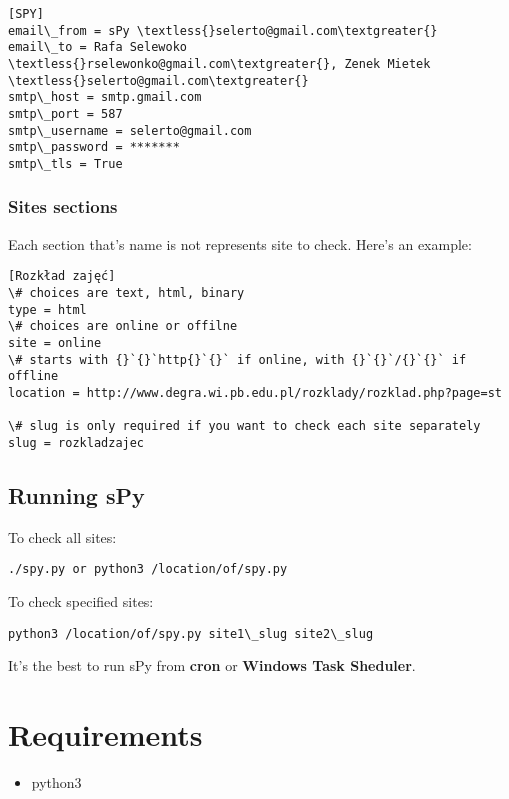 \documentclass[letterpaper,10pt,english]{sphinxmanual}
\begin{document}
\begin{Verbatim}[commandchars=\\\{\}]
[SPY]
email\_from = sPy \textless{}selerto@gmail.com\textgreater{}
email\_to = Rafa Selewoko \textless{}rselewonko@gmail.com\textgreater{}, Zenek Mietek \textless{}selerto@gmail.com\textgreater{}
smtp\_host = smtp.gmail.com
smtp\_port = 587
smtp\_username = selerto@gmail.com
smtp\_password = *******
smtp\_tls = True
\end{Verbatim}


\subsection{Sites sections}
\label{index:sites-sections}
Each section that's name is not  represents site to check. Here's an example:

\begin{Verbatim}[commandchars=\\\{\}]
[Rozkład zajęć]
\# choices are text, html, binary
type = html
\# choices are online or offilne
site = online
\# starts with {}`{}`http{}`{}` if online, with {}`{}`/{}`{}` if offline
location = http://www.degra.wi.pb.edu.pl/rozklady/rozklad.php?page=st

\# slug is only required if you want to check each site separately
slug = rozkladzajec
\end{Verbatim}


\section{Running sPy}
\label{index:running-spy}
To check all sites:

\begin{Verbatim}[commandchars=\\\{\}]
./spy.py or python3 /location/of/spy.py
\end{Verbatim}

To check specified sites:

\begin{Verbatim}[commandchars=\\\{\}]
python3 /location/of/spy.py site1\_slug site2\_slug
\end{Verbatim}

It's the best to run sPy from \textbf{cron} or \textbf{Windows Task Sheduler}.


\chapter{Requirements}
\label{index:requirements}\begin{itemize}
\item {} 
python3

\end{itemize}
\end{document}
